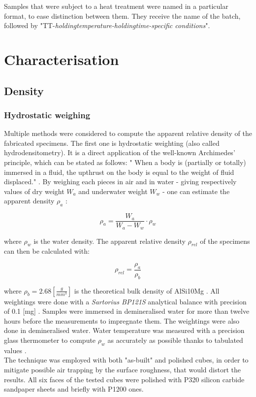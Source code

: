 Samples that were subject to a heat treatment were named in a particular format, to ease distinction between them. They receive the name of the batch, followed by "TT-\textit{holdingtemperature-holdingtime-specific conditions}".

\section{Characterisation}

\subsection{Density}

\subsubsection{Hydrostatic weighing}

Multiple methods were considered to compute the apparent relative density of the fabricated specimens. The first one is hydrostatic weighting (also called hydrodensitometry). It is a direct application of the well-known Archimedes' principle, which can be stated as follows: " When a body is (partially or totally) immersed in a fluid, the upthrust on the body is equal to the weight of fluid displaced." \parencite{ADictionaryofPhysics}. By weighing each pieces in air and in water - giving respectively values of dry weight $W_a$ and underwater weight $W_w$ - one can estimate the apparent density $\rho_a$ \parencite{MethArch}:

$$\rho_a=\frac{W_a}{W_a-W_w} \cdot \rho_w $$

where $\rho_w$ is the water density. The apparent relative density $\rho_{rel}$ of the specimens can then be calculated with:

$$\rho_{rel} = \frac{\rho_a}{\rho_b} $$

where $\rho_b = 2.68 [\frac{g}{mm^3}]$ is the theoretical bulk density of AlSi10Mg \parencite{Bulk}. All weightings were done with a \textit{Sartorius BP121S} analytical balance with precision of 0.1 [mg] \parencite{Balance}. Samples were immersed in demineralised water for more than twelve hours before the measurements to impregnate them. The weightings were also done in demineralised water. Water temperature was measured with a precision glass thermometer to compute $\rho_w$ as accurately as possible thanks to tabulated values \parencite{Eau}.\\

The technique was employed with both "as-built" and polished cubes, in order to mitigate possible air trapping by the surface roughness, that would distort the results. %
All six faces of the tested cubes were polished with P320 silicon carbide sandpaper sheets and briefly with P1200 ones.\\

